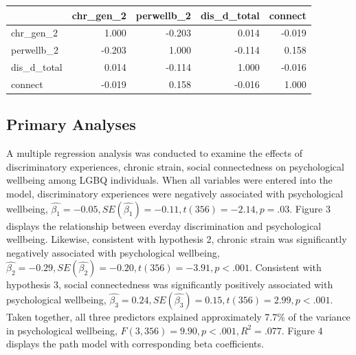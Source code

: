 \documentclass[
  english,
  man,floatsintext]{apa6}
\begin{document}
\begin{tabular}{l|r|r|r|r}
\hline
  & chr\_gen\_2 & perwellb\_2 & dis\_d\_total & connect\\
\hline
chr\_gen\_2 & 1.000 & -0.203 & 0.014 & -0.019\\
\hline
perwellb\_2 & -0.203 & 1.000 & -0.114 & 0.158\\
\hline
dis\_d\_total & 0.014 & -0.114 & 1.000 & -0.016\\
\hline
connect & -0.019 & 0.158 & -0.016 & 1.000\\
\hline
\end{tabular}

\hypertarget{primary-analyses}{%
\subsection{Primary Analyses}\label{primary-analyses}}

A multiple regression analysis was conducted to examine the effects of discriminatory experiences, chronic strain, social connectedness on psychological wellbeing among LGBQ individuals. When all variables were entered into the model, discriminatory experiences were negatively associated with psychological wellbeing, \(\hat{\beta_{1}}=-0.05, SE(\hat{\beta_{1}})=-0.11, t(356)=-2.14, p=.03\). Figure 3 displays the relationship between everday discrimination and psychological wellbeing. Likewise, consistent with hypothesis 2, chronic strain was significantly negatively associated with psychological wellbeing, \(\hat{\beta_{2}}=-0.29, SE(\hat{\beta_{2}})=-0.20, t(356)=-3.91, p < .001\). Consistent with hypothesis 3, social connectedness was significantly positively associated with psychological wellbeing, \(\hat{\beta_{3}}=0.24, SE(\hat{\beta_{3}})=0.15, t(356)=2.99, p < .001\). Taken together, all three predictors explained approximately 7.7\% of the variance in psychological wellbeing, \(F(3,356)=9.90, p<.001, R^{2}=.077\). Figure 4 displays the path model with corresponding beta coefficients.
\end{document}
